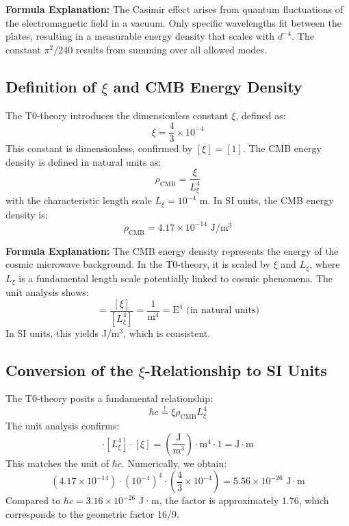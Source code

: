 	\textbf{Formula Explanation:} The Casimir effect arises from quantum fluctuations of the electromagnetic field in a vacuum. Only specific wavelengths fit between the plates, resulting in a measurable energy density that scales with $d^{-4}$. The constant $\pi^2/240$ results from summing over all allowed modes.
	
	\subsection{Definition of $\xi$ and CMB Energy Density}
	The T0-theory introduces the dimensionless constant $\xi$, defined as:
	\begin{equation}
		\xi = \frac{4}{3} \times 10^{-4}
	\end{equation}
	This constant is dimensionless, confirmed by $[\xi] = [1]$. The CMB energy density is defined in natural units as:
	\begin{equation}
		\rho_{\text{CMB}} = \frac{\xi}{L_\xi^4}
	\end{equation}
	with the characteristic length scale $L_\xi = 10^{-4}$ m. In SI units, the CMB energy density is:
	\begin{equation}
		\rho_{\text{CMB}} = 4.17 \times 10^{-14} \text{ J}/\text{m}^3
	\end{equation}
	
	\textbf{Formula Explanation:} The CMB energy density represents the energy of the cosmic microwave background. In the T0-theory, it is scaled by $\xi$ and $L_\xi$, where $L_\xi$ is a fundamental length scale potentially linked to cosmic phenomena. The unit analysis shows:
	\begin{equation}
		[\rho_{\text{CMB}}] = \frac{[\xi]}{[L_\xi^4]} = \frac{1}{\text{m}^4} = \text{E}^4 \text{ (in natural units)}
	\end{equation}
	In SI units, this yields J/m$^3$, which is consistent.
	
	\subsection{Conversion of the $\xi$-Relationship to SI Units}
	The T0-theory posits a fundamental relationship:
	\begin{equation}
		\hbar c \stackrel{!}{=} \xi \rho_{\text{CMB}} L_\xi^4
	\end{equation}
	The unit analysis confirms:
	\begin{equation}
		[\rho_{\text{CMB}}] \cdot [L_\xi^4] \cdot [\xi] = \left( \frac{\text{J}}{\text{m}^3} \right) \cdot \text{m}^4 \cdot 1 = \text{J} \cdot \text{m}
	\end{equation}
	This matches the unit of $\hbar c$. Numerically, we obtain:
	\begin{equation}
		\left( 4.17 \times 10^{-14} \right) \cdot \left( 10^{-4} \right)^4 \cdot \left( \frac{4}{3} \times 10^{-4} \right) = 5.56 \times 10^{-26} \text{ J} \cdot \text{m}
	\end{equation}
	Compared to $\hbar c = 3.16 \times 10^{-26}$ J·m, the factor is approximately 1.76, which corresponds to the geometric factor 16/9.
	
